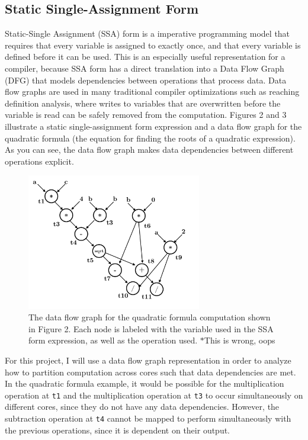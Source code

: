 \documentclass{sig-alternate-05-2015}
\newcommand{\note}{\color{red}$*$}
\begin{document}
\subsection{Static Single-Assignment Form}
Static-Single Assignment (SSA) form is a imperative programming model that requires that every variable is assigned to exactly once, and that every variable is defined before it can be used. This is an especially useful representation for a compiler, because SSA form has a direct translation into a Data Flow Graph (DFG) that models dependencies between operations that process data. Data flow graphs are used in many traditional compiler optimizations such as reaching definition analysis, where writes to variables that are overwritten before the variable is read can be safely removed from the computation. Figures 2 and 3 illustrate a static single-assignment form expression and a data flow graph for the quadratic formula (the equation for finding the roots of a quadratic expression). As you can see, the data flow graph makes data dependencies between different operations explicit. 
\begin{figure}
\centering
\includegraphics[width=3in]{data-flow.png}
\caption{The data flow graph for the quadratic formula computation shown in Figure 2. Each node is labeled with the variable used in the SSA form expression, as well as the operation used. {\note This is wrong, oops}}
\end{figure}
For this project, I will use a data flow graph representation in order to analyze how to partition computation across cores such that data dependencies are met. In the quadratic formula example, it would be possible for the multiplication operation at \texttt{t1} and the multiplication operation at \texttt{t3} to occur simultaneously on different cores, since they do not have any data dependencies. However, the subtraction operation at \texttt{t4} cannot be mapped to perform simultaneously with the previous operations, since it is dependent on their output. 
\end{document}

